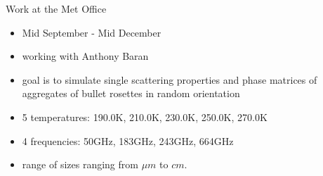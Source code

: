 \documentclass[12pt]{beamer}
\begin{document}
\begin{frame}{Work at the Met Office}
    \begin{itemize}
        \item Mid September - Mid December
        \item working with Anthony Baran
        \item goal is to simulate single scattering properties and phase matrices of aggregates of bullet rosettes in random orientation
        \item 5 temperatures: 190.0K, 210.0K, 230.0K, 250.0K, 270.0K
        \item 4 frequencies: 50GHz, 183GHz, 243GHz, 664GHz
        \item range of sizes ranging from $\mu m$ to $cm$.
    \end{itemize}
\end{frame}




\end{document}
